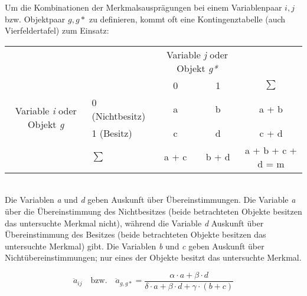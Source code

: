 Um die Kombinationen der Merkmalsausprägungen bei einem Variablenpaar $i,j$ bzw. Objektpaar $g,g*$ zu definieren, kommt oft eine Kontingenztabelle (auch Vierfeldertafel) zum Einsatz: \\

\begin{tabular}{cl|cc|c}
	& & \multicolumn{2}{c|}{Variable \textit{j} oder Objekt \textit{g*}} & \\ 
	& & 0 & 1 & $\sum$ \\ \hline
	\multirow{2}{*}{Variable \textit{i} oder Objekt \textit{g}} & 0 (Nichtbesitz) & a & b & a + b \\
	& 1 (Besitz) & c & d & c + d \\ \hline
	& $\sum$ & a + c & b + d & a + b + c + d = m \\ 
\end{tabular}
\bigskip
\\
Die Variablen \textit{a} und \textit{d} geben Auskunft über Übereinstimmungen. Die Variable \textit{a} über die Übereinstimmung des Nichtbesitzes (beide betrachteten Objekte besitzen das untersuchte Merkmal nicht), während die Variable \textit{d} Auskunft über Übereinstimmung des Besitzes (beide betrachteten Objekte besitzen das untersuchte Merkmal) gibt. Die Variablen \textit{b} und \textit{c} geben Auskunft über Nichtübereinstimmungen; nur eines der Objekte besitzt das untersuchte Merkmal.

\begin{equation}
\ddot{a}_{ij} \quad \text{bzw.} \quad \ddot{a}_{g,g*} = \frac{\alpha \cdot a + \beta \cdot d}{\delta \cdot a + \beta \cdot d + \gamma \cdot (b + c)}
\end{equation}

